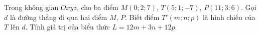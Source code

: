 \begin{ex}
Trong không gian $Oxyz$, cho ba điểm $M(0;2;7)$, $T(5;1;-7)$, $P(11;3;6)$. Gọi $d$ là đường thẳng đi qua hai điểm $M$, $P$. Biết điểm $T'(m;n;p)$ là hình chiếu của $T$ lên $d$. Tính giá trị của biểu thức $L=12m+3n+12p$.
\end{ex}
